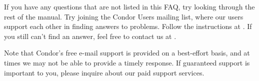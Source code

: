 If you have any questions that are not listed in this FAQ, try looking
through the rest of the manual.
Try joining the Condor Users mailing list, where our users
support each other in finding answers to problems.
Follow the instructions at
.
If you still can't find an answer, feel free to contact us at
.

Note that Condor's free e-mail support is provided on a best-effort
basis, and at times we may not be able to provide a timely response.
If guaranteed support is important to you, please inquire about our
paid support services.



